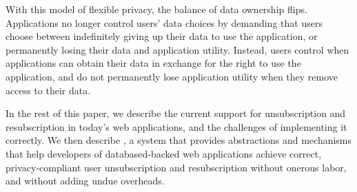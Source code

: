 %
With this model of flexible privacy, the balance of data ownership flips. Applications no longer
control users' data choices by demanding that users choose between indefinitely giving up their data
to use the application, or permanently losing their data and application utility.
Instead, users control when applications can obtain their data in exchange for the right to use the application, and do not permanently lose application utility when they remove access to their data.

In the rest of this paper, we describe the current support for unsubscription and resubscription in
today's web applications, and the challenges of implementing it correctly.  We then describe \sys, a
system that provides abstractions and mechanisms that help developers of databased-backed web
applications achieve correct, privacy-compliant user unsubscription and resubscription without
onerous labor, and without adding undue overheads.
